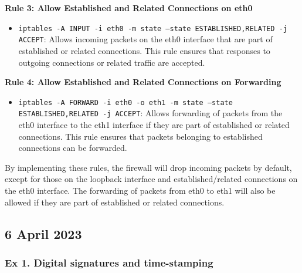 {\begin{enumerate}
	\textbf{Rule 3: Allow Established and Related Connections on eth0}
	\begin{itemize}
		\item \texttt{iptables -A INPUT -i eth0 -m state --state ESTABLISHED,RELATED -j ACCEPT}: Allows incoming packets on the eth0 interface that are part of established or related connections. This rule ensures that responses to outgoing connections or related traffic are accepted.
	\end{itemize}
	
	\textbf{Rule 4: Allow Established and Related Connections on Forwarding}
	\begin{itemize}
		\item \texttt{iptables -A FORWARD -i eth0 -o eth1 -m state --state ESTABLISHED,RELATED -j ACCEPT}: Allows forwarding of packets from the eth0 interface to the eth1 interface if they are part of established or related connections. This rule ensures that packets belonging to established connections can be forwarded.
	\end{itemize}
	
	By implementing these rules, the firewall will drop incoming packets by default, except for those on the loopback interface and established/related connections on the eth0 interface. The forwarding of packets from eth0 to eth1 will also be allowed if they are part of established or related connections.
	\end{enumerate}}

	\newpage
	\subsection{6 April 2023}
	\subsubsection{Ex 1. Digital signatures and time-stamping}	
	
